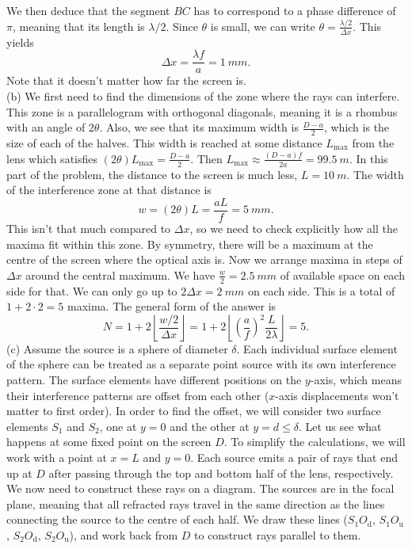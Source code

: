 \documentclass[../TST.tex]{subfiles}
\begin{document}
\begin{solution}
We then deduce that the segment $BC$ has to correspond to a phase difference of $\pi$, meaning that its length is $\lambda/2$. Since $\theta$ is small, we can write $\theta=\frac{\lambda/2}{\Delta x}$. This yields 
\begin{equation*}
	\boxed{\Delta x = \frac{\lambda f}{a}=\qty{1}{mm}.}
\end{equation*}
Note that it doesn't matter how far the screen is.\\

(b) We first need to find the dimensions of the zone where the rays can interfere. This zone is a parallelogram with orthogonal diagonals, meaning it is a rhombus with an angle of $2\theta$. Also, we see that its maximum width is $\frac{D-a}{2}$, which is the size of each of the halves. This width is reached at some distance $L_\mathrm{max}$ from the lens which satisfies $(2\theta)L_\mathrm{max}=\frac{D-a}{2}$. Then $L_\mathrm{max}\approx \frac{(D-a)f}{2a}=\qty{99.5}{m}$. In this part of the problem, the distance to the screen is much less, $L=\qty{10}{m}$. The width of the interference zone at that distance is 
\begin{equation*}
w=(2\theta)L=\frac{aL}{f}=\qty{5}{mm}
.
\end{equation*}
This isn't that much compared to $\Delta x$, so we need to check explicitly how all the maxima fit within this zone. By symmetry, there will be a maximum at the centre of the screen where the optical axis is. Now we arrange maxima in steps of $\Delta x$ around the central maximum. We have $\frac{w}{2}=\qty{2.5}{mm}$ of available space on each side for that. We can only go up to $2\Delta x =\qty{2}{mm}$ on each side. This is a total of $1+2\cdot 2 = 5$ maxima. The general form of the answer is
\begin{equation*}
	N=1+2\left\lfloor \frac{w/2}{\Delta x}\right\rfloor = \boxed{1+2\left\lfloor \left(\frac{a}{f}\right)^2 \frac{L}{2\lambda}  \right\rfloor = 5.}
\end{equation*}
(c) Assume the source is a sphere of diameter $\delta$. Each individual surface element of the sphere can be treated as a separate point source with its own interference pattern. The surface elements have different positions on the $y$-axis, which means their interference patterns are offset from each other ($x$-axis displacements won't matter to first order). In order to find the offset, we will consider two surface elements $S_1$ and $S_2$, one at $y=0$ and the other at $y=d\leq \delta$. Let us see what happens at some fixed point on the screen $D$. To simplify the calculations, we will work with a point at $x=L$ and $y=0$. Each source emits a pair of rays that end up at $D$ after passing through the top and bottom half of the lens, respectively. We now need to construct these rays on a diagram. The sources are in the focal plane, meaning that all refracted rays travel in the same direction as the lines connecting the source to the centre of each half. We draw these lines ($S_1O_\mathrm{d}$, $S_1O_\mathrm{u}$, $S_2O_\mathrm{d}$, $S_2O_\mathrm{u}$), and work back from $D$ to construct rays parallel to them.

\end{solution}
\end{document}
